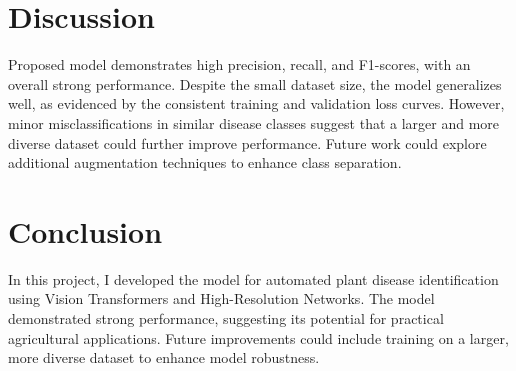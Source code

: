 \documentclass[conference]{IEEEtran}
\begin{document}
\section{Discussion}
Proposed model demonstrates high precision, recall, and F1-scores, with an overall strong performance. Despite the small dataset size, the model generalizes well, as evidenced by the consistent training and validation loss curves. However, minor misclassifications in similar disease classes suggest that a larger and more diverse dataset could further improve performance. Future work could explore additional augmentation techniques to enhance class separation.

\section{Conclusion}
In this project, I developed the model for automated plant disease identification using Vision Transformers and High-Resolution Networks. The model demonstrated strong performance, suggesting its potential for practical agricultural applications. Future improvements could include training on a larger, more diverse dataset to enhance model robustness.




\end{document}
